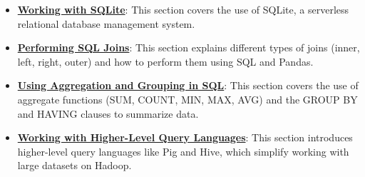 \documentclass{article}%
\begin{document}
\begin{itemize}[leftmargin=*]
\item \href{https://purdue.brightspace.com/d2l/common/assets/pdfjs-d2l-dist/1.0.14-legacy/web/viewer.html?file=\%2Fcontent\%2Fenforced\%2F1095465-WL.202510.CS24200.LE1\%2F23L2-relationaldb-sql.pdf\%3Fou\%3D1095465\&lang=en-us\&container=d2l-fileviewer-rendered-pdf\&fullscreen=d2l-fileviewer-rendered-pdf-dialog\&height=667#page=19}{\textbf{Working with SQLite}}: This section covers the use of SQLite, a serverless relational database management system.%
\item \href{https://purdue.brightspace.com/d2l/common/assets/pdfjs-d2l-dist/1.0.14-legacy/web/viewer.html?file=\%2Fcontent\%2Fenforced\%2F1095465-WL.202510.CS24200.LE1\%2F23L2-relationaldb-sql.pdf\%3Fou\%3D1095465\&lang=en-us\&container=d2l-fileviewer-rendered-pdf\&fullscreen=d2l-fileviewer-rendered-pdf-dialog\&height=667#page=27}{\textbf{Performing SQL Joins}}: This section explains different types of joins (inner, left, right, outer) and how to perform them using SQL and Pandas.%
\item \href{https://purdue.brightspace.com/d2l/common/assets/pdfjs-d2l-dist/1.0.14-legacy/web/viewer.html?file=\%2Fcontent\%2Fenforced\%2F1095465-WL.202510.CS24200.LE1\%2F23L2-relationaldb-sql.pdf\%3Fou\%3D1095465\&lang=en-us\&container=d2l-fileviewer-rendered-pdf\&fullscreen=d2l-fileviewer-rendered-pdf-dialog\&height=667#page=45}{\textbf{Using Aggregation and Grouping in SQL}}: This section covers the use of aggregate functions (SUM, COUNT, MIN, MAX, AVG) and the GROUP BY and HAVING clauses to summarize data.%
\item \href{https://purdue.brightspace.com/d2l/common/assets/pdfjs-d2l-dist/1.0.14-legacy/web/viewer.html?file=\%2Fcontent\%2Fenforced\%2F1095465-WL.202510.CS24200.LE1\%2F23L2-relationaldb-sql.pdf\%3Fou\%3D1095465\&lang=en-us\&container=d2l-fileviewer-rendered-pdf\&fullscreen=d2l-fileviewer-rendered-pdf-dialog\&height=667#page=55}{\textbf{Working with Higher-Level Query Languages}}: This section introduces higher-level query languages like Pig and Hive, which simplify working with large datasets on Hadoop.%
\end{itemize}

%
\end{document}

